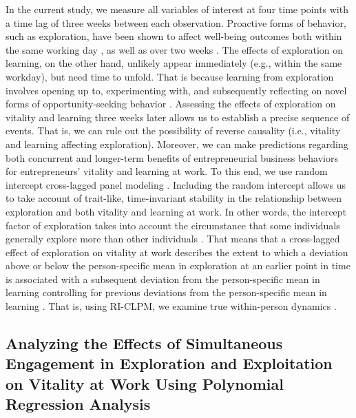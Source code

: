 \documentclass[man]{apa7}
\begin{document}
In the current study, we measure all variables of interest at four time points with a time lag of three weeks between each observation.  
Proactive forms of behavior, such as exploration, have been shown to affect well-being outcomes both within the same working day \parencite{Niessen.2012}, as well as over two weeks \parencite{Strauss.2017}. 
The effects of exploration on learning, on the other hand, unlikely appear immediately (e.g., within the same workday), but need time to unfold. 
That is because learning from exploration involves opening up to, experimenting with, and subsequently reflecting on novel forms of opportunity-seeking behavior \parencite{Holcomb2009}. 
Assessing the effects of exploration on vitality and learning three weeks later allows us to establish a precise sequence of events. 
That is, we can rule out the possibility of reverse causality (i.e., vitality and learning affecting exploration). 
Moreover, we can make predictions regarding both concurrent and longer-term benefits of entrepreneurial business behaviors for entrepreneurs' vitality and learning at work. 
To this end, we use random intercept cross-lagged panel modeling \parencite[RI-CLPM;][]{Hamaker.2015}.  
Including the random intercept allows us to take account of trait-like, time-invariant stability in the relationship between exploration and both vitality and learning at work.
In other words, the intercept factor of exploration takes into account the circumstance that some individuals generally explore more than other individuals \parencite{Mund2019}.
That means that a cross-lagged effect of exploration on vitality at work describes the extent to which a deviation above or below the person-specific mean in exploration at an earlier point in time is associated with a subsequent deviation from the person-specific mean in learning controlling for previous deviations from the person-specific mean in learning \parencite{Hamaker.2015, Mund2019}. 
That is, using RI-CLPM, we examine true within-person dynamics \parencite{Hamaker.2015}. 

\subsection{Analyzing the Effects of Simultaneous Engagement in Exploration and Exploitation on Vitality at Work Using Polynomial Regression Analysis}
\end{document}
